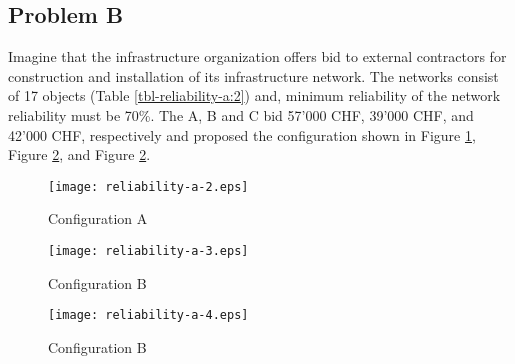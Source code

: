 \subsection{Problem B}
Imagine that the infrastructure organization offers bid to external contractors
for construction and installation of its infrastructure network. The networks
consist of 17 objects (Table \ref{tbl-reliability-a:2}) and, minimum reliability of the network
reliability must be 70\%. The A, B and C bid 57'000 CHF, 39'000 CHF, and 42'000
CHF, respectively and proposed the configuration shown in Figure \ref{reliability-a-2},
Figure \ref{reliability-a-3}, and Figure \ref{reliability-a-3}.
%
\begin{figure}[h]
\texttt{[image: reliability-a-2.eps]}
\caption{Configuration A}\label{reliability-a-2}
\end{figure}
%
\begin{figure}[h]
\texttt{[image: reliability-a-3.eps]}
\caption{Configuration B}\label{reliability-a-3}
\end{figure}
%
\begin{figure}[h]
\texttt{[image: reliability-a-4.eps]}
\caption{Configuration B}\label{reliability-a-4}
\end{figure}
%
